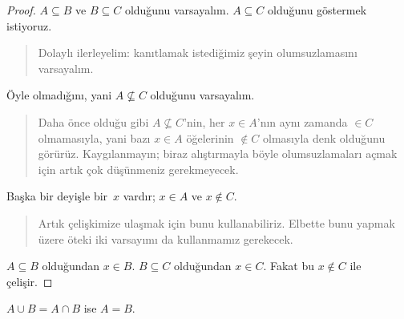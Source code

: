 \begin{proof}
  $A \subseteq B$ ve $B \subseteq C$ olduğunu varsayalım. $A
  \subseteq C$ olduğunu göstermek istiyoruz.
  \begin{quote}
    Dolaylı ilerleyelim: kanıtlamak istediğimiz şeyin olumsuzlamasını
    varsayalım.
  \end{quote}
  Öyle olmadığını, yani $A \nsubseteq C$ olduğunu varsayalım.
  \begin{quote}
    Daha önce olduğu gibi $A \nsubseteq C$'nin, her $x \in A$'nın aynı
    zamanda $\in C$ olmamasıyla, yani bazı $x \in A$ öğelerinin $\notin C$
    olmasıyla denk olduğunu görürüz. Kaygılanmayın; biraz alıştırmayla
    böyle olumsuzlamaları açmak için artık çok düşünmeniz gerekmeyecek.
  \end{quote}
  Başka bir deyişle bir~$x$ vardır; $x \in A$ ve $x \notin C$.
  \begin{quote}
    Artık çelişkimize ulaşmak için bunu kullanabiliriz. Elbette bunu
    yapmak üzere öteki iki varsayımı da kullanmamız gerekecek.
  \end{quote}
  $A \subseteq B$ olduğundan $x \in B$. $B \subseteq C$ olduğundan $x
  \in C$. Fakat bu $x \notin C$ ile çelişir.
\end{proof}

\begin{prop}
$A \cup B = A \cap B$ ise $A = B$.
\end{prop}

